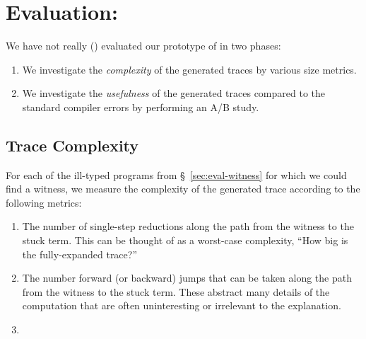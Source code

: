 \section{Evaluation: \nanomaly}
\label{sec:evaluation-nanomaly}
We have not really () evaluated our prototype of \nanomaly in two phases:
%
\begin{enumerate}
\item We investigate the \emph{complexity} of the generated traces by various size metrics.
\item We investigate the \emph{usefulness} of the generated traces compared to the standard compiler errors by performing an A/B study.
\end{enumerate}

\subsection{Trace Complexity}
\label{sec:trace-complexity}
For each of the ill-typed programs from \S~\ref{sec:eval-witness} for
which we could find a witness, we measure the complexity of the
generated trace according to the following metrics:
%
\begin{enumerate}
\item The number of single-step reductions along the path from the
  witness to the stuck term. This can be thought of as a worst-case
  complexity, \ie ``How big is the fully-expanded trace?''
\item The number forward (or backward) jumps that can be taken along the
  path from the witness to the stuck term. These abstract many details
  of the computation that are often uninteresting or irrelevant to the
  explanation.
\item {}
\end{enumerate}
%
